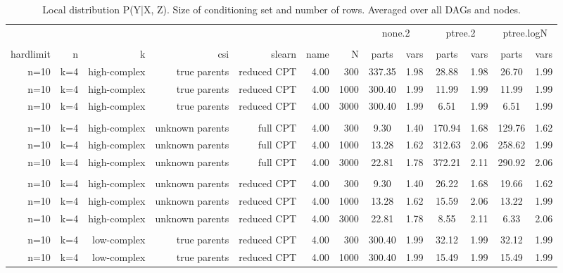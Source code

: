 \begin{table}[ht]
\centering
\caption{Local distribution P(Y|X, Z). Size of conditioning set and number of rows. Averaged over all DAGs and nodes.} 
\begin{tabular}{rrrrrrr|cc|cc|cc}
  \toprule
   & & & & & & &\multicolumn{2}{c}{none.2}&\multicolumn{2}{c}{ptree.2}&\multicolumn{2}{c}{ptree.logN}   \\ 
 \cline{8-13}  \\ 
 hardlimit & n & k & csi & slearn & name & N & parts & vars & parts & vars & parts & vars  \\ 
 \midrule
n=10 & k=4 & high-complex & true parents & reduced CPT & 4.00 & 300 & 337.35 & 1.98 & 28.88 & 1.98 & 26.70 & 1.99 \\ 
  n=10 & k=4 & high-complex & true parents & reduced CPT & 4.00 & 1000 & 300.40 & 1.99 & 11.99 & 1.99 & 11.99 & 1.99 \\ 
  n=10 & k=4 & high-complex & true parents & reduced CPT & 4.00 & 3000 & 300.40 & 1.99 & 6.51 & 1.99 & 6.51 & 1.99 \\ 
   \\ 
n=10 & k=4 & high-complex & unknown parents & full CPT & 4.00 & 300 & 9.30 & 1.40 & 170.94 & 1.68 & 129.76 & 1.62 \\ 
  n=10 & k=4 & high-complex & unknown parents & full CPT & 4.00 & 1000 & 13.28 & 1.62 & 312.63 & 2.06 & 258.62 & 1.99 \\ 
  n=10 & k=4 & high-complex & unknown parents & full CPT & 4.00 & 3000 & 22.81 & 1.78 & 372.21 & 2.11 & 290.92 & 2.06 \\ 
   \\ 
n=10 & k=4 & high-complex & unknown parents & reduced CPT & 4.00 & 300 & 9.30 & 1.40 & 26.22 & 1.68 & 19.66 & 1.62 \\ 
  n=10 & k=4 & high-complex & unknown parents & reduced CPT & 4.00 & 1000 & 13.28 & 1.62 & 15.59 & 2.06 & 13.22 & 1.99 \\ 
  n=10 & k=4 & high-complex & unknown parents & reduced CPT & 4.00 & 3000 & 22.81 & 1.78 & 8.55 & 2.11 & 6.33 & 2.06 \\ 
   \\ 
n=10 & k=4 & low-complex & true parents & reduced CPT & 4.00 & 300 & 300.40 & 1.99 & 32.12 & 1.99 & 32.12 & 1.99 \\ 
  n=10 & k=4 & low-complex & true parents & reduced CPT & 4.00 & 1000 & 300.40 & 1.99 & 15.49 & 1.99 & 15.49 & 1.99 \\ 

\end{tabular}
\end{table}
